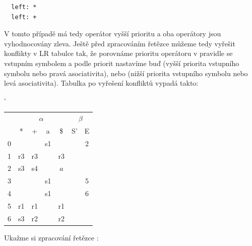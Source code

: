 \begin{exmp}
\begin{lstlisting}
  left: *
  left: +
\end{lstlisting}

V tomto případě má tedy operátor  \symb{*} vyšší prioritu a oba operátory jsou vyhodnocovány zleva.
Ještě před zpracováním řetězce můžeme tedy vyřešit konflikty v LR tabulce tak,
že porovnáme prioritu operátoru v  pravidle se vstupním symbolem
a podle priorit nastavíme buď  (vyšší priorita vstupního symbolu nebo pravá asociativita),
nebo  (nižší priorita vstupního symbolu nebo levá asociativita).
Tabulka po vyřešení konfliktů vypadá takto:

\begin{table}[H]
  \catcode`
  \centering
  \begin{tabular}{| c || c | c | c | c || c | c |}
    \hline
    \multirow{2}{*}{} & \multicolumn{4}{c||}{$\alpha$}& \multicolumn{2}{c|}{$\beta$} \\
    \cline{2-7}
      & * & + & a & \$& S'& E \\
    \hhline{|=||=|=|=|=||=|=|}
    0 &   &   & s1 &   &   & 2 \\
    \hline
    1 & r3 & r3 &   & r3 &   &   \\
    \hline
    2 & s3 & s4 &   & $a$ &   &   \\
    \hline
    3 &   &   & s1 &   &   & 5 \\
    \hline
    4 &   &   & s1 &   &   & 6 \\
    \hline
    5 & r1 &  r1 & & r1 &   & \\
    \hline
    6 & s3 &  r2 & & r2 &   & \\
    \hline
  \end{tabular}
\end{table}

Ukažme si zpracování řetězce :
\begin{figure}[H]
  \centering
\end{figure}


\end{exmp}
